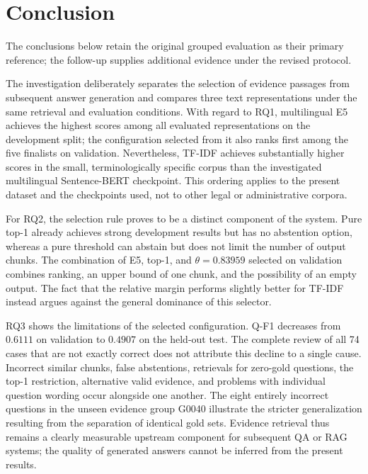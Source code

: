 \documentclass[11pt]{article}
\newcommand{\revision}[1]{{\color{blue}#1}}
\begin{document}
\section{Conclusion}

\revision{The conclusions below retain the original grouped evaluation as their primary reference; the follow-up supplies additional evidence under the revised protocol.}

The investigation deliberately separates the selection of evidence passages from subsequent answer generation and compares three text representations under the same retrieval and evaluation conditions. With regard to RQ1, multilingual E5 achieves the highest scores among all evaluated representations on the development split; the configuration selected from it also ranks first among the five finalists on validation. Nevertheless, TF-IDF achieves substantially higher scores in the small, terminologically specific corpus than the investigated multilingual Sentence-BERT checkpoint. This ordering applies to the present dataset and the checkpoints used, not to other legal or administrative corpora.

For RQ2, the selection rule proves to be a distinct component of the system. Pure top-1 already achieves strong development results but has no abstention option, whereas a pure threshold can abstain but does not limit the number of output chunks. The combination of E5, top-1, and $\theta=0.83959$ selected on validation combines ranking, an upper bound of one chunk, and the possibility of an empty output. The fact that the relative margin performs slightly better for TF-IDF instead argues against the general dominance of this selector.

RQ3 shows the limitations of the selected configuration. Q-F1 decreases from $0.6111$ on validation to $0.4907$ on the held-out test. The complete review of all 74 cases that are not exactly correct does not attribute this decline to a single cause. Incorrect similar chunks, false abstentions, retrievals for zero-gold questions, the top-1 restriction, alternative valid evidence, and problems with individual question wording occur alongside one another. The eight entirely incorrect questions in the unseen evidence group G0040 illustrate the stricter generalization resulting from the separation of identical gold sets. Evidence retrieval thus remains a clearly measurable upstream component for subsequent QA or RAG systems; the quality of generated answers cannot be inferred from the present results.
\end{document}
